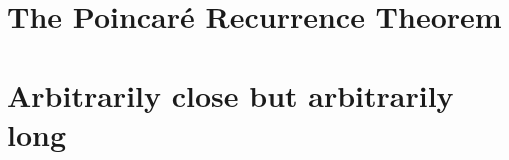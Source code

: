 \documentclass[a4paper,10pt]{article}
\begin{document}
\section{The Poincar\'e Recurrence Theorem}

\section{Arbitrarily close but arbitrarily long}









\end{document}
